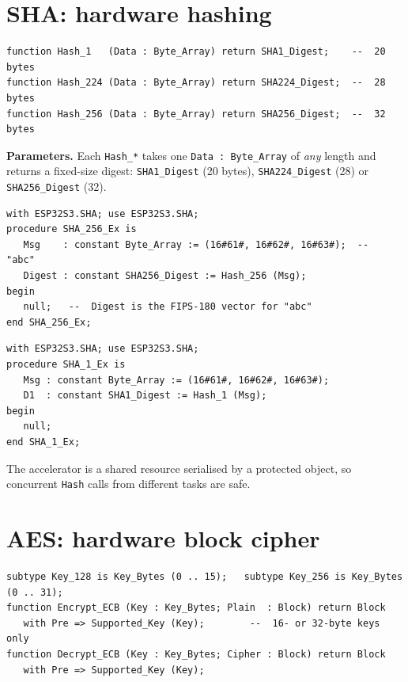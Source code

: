 \section{SHA: hardware hashing}

\begin{lstlisting}
function Hash_1   (Data : Byte_Array) return SHA1_Digest;    --  20 bytes
function Hash_224 (Data : Byte_Array) return SHA224_Digest;  --  28 bytes
function Hash_256 (Data : Byte_Array) return SHA256_Digest;  --  32 bytes
\end{lstlisting}

\textbf{Parameters.} Each \texttt{Hash\_*} takes one \texttt{Data : Byte\_Array} of
\emph{any} length and returns a fixed-size digest: \texttt{SHA1\_Digest}
(20 bytes), \texttt{SHA224\_Digest} (28) or \texttt{SHA256\_Digest} (32).

\begin{lstlisting}
with ESP32S3.SHA; use ESP32S3.SHA;
procedure SHA_256_Ex is
   Msg    : constant Byte_Array := (16#61#, 16#62#, 16#63#);  --  "abc"
   Digest : constant SHA256_Digest := Hash_256 (Msg);
begin
   null;   --  Digest is the FIPS-180 vector for "abc"
end SHA_256_Ex;
\end{lstlisting}

\begin{lstlisting}
with ESP32S3.SHA; use ESP32S3.SHA;
procedure SHA_1_Ex is
   Msg : constant Byte_Array := (16#61#, 16#62#, 16#63#);
   D1  : constant SHA1_Digest := Hash_1 (Msg);
begin
   null;
end SHA_1_Ex;
\end{lstlisting}

The accelerator is a shared resource serialised by a protected object, so
concurrent \texttt{Hash} calls from different tasks are safe.

\section{AES: hardware block cipher}

\begin{lstlisting}
subtype Key_128 is Key_Bytes (0 .. 15);   subtype Key_256 is Key_Bytes (0 .. 31);
function Encrypt_ECB (Key : Key_Bytes; Plain  : Block) return Block
   with Pre => Supported_Key (Key);        --  16- or 32-byte keys only
function Decrypt_ECB (Key : Key_Bytes; Cipher : Block) return Block
   with Pre => Supported_Key (Key);
\end{lstlisting}

